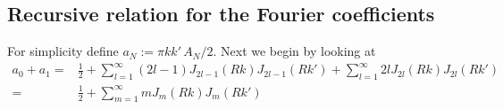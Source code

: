 \documentclass[11pt,a4paper, 
swedish, english %
]{article}
\begin{document}
\subsection{Recursive relation for the Fourier coefficients}
For simplicity define $a_N:=\pi kk'\,A_N/2$. Next we begin by looking
at
\begin{equation}
\begin{aligned}
a_0+a_1 =& 
\frac{1}{2}+\sum_{l=1}^\infty (2l-1) J_{2l-1}(Rk)J_{2l-1}(Rk')
+\sum_{l=1}^\infty 2l J_{2l}(Rk)J_{2l}(Rk')\\
=& \frac{1}{2} + \sum_{m=1}^\infty m J_{m}(Rk)J_{m}(Rk')
\end{aligned}
\end{equation}














\end{document}

